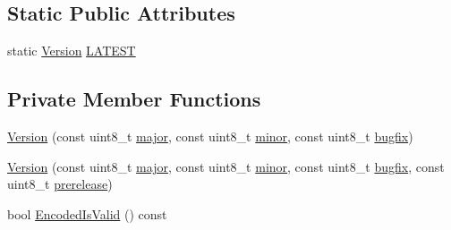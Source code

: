 \subsection*{Static Public Attributes}
\begin{DoxyCompactItemize}
\item 
static \mbox{\hyperlink{classlucene_1_1core_1_1util_1_1etc_1_1Version}{Version}} \mbox{\hyperlink{classlucene_1_1core_1_1util_1_1etc_1_1Version_af15c59aee2ac8af16ebc5f004a553b3d}{L\+A\+T\+E\+ST}}
\end{DoxyCompactItemize}
\subsection*{Private Member Functions}
\begin{DoxyCompactItemize}
\item 
\mbox{\hyperlink{classlucene_1_1core_1_1util_1_1etc_1_1Version_aab6be2fea4aac2881ae89ce58de8adcf}{Version}} (const uint8\+\_\+t \mbox{\hyperlink{classlucene_1_1core_1_1util_1_1etc_1_1Version_a3dfe19c8cebead3a00ef2d62a7258a2f}{major}}, const uint8\+\_\+t \mbox{\hyperlink{classlucene_1_1core_1_1util_1_1etc_1_1Version_af2b0edc664bfbd88c3beeec7aaf1f5cd}{minor}}, const uint8\+\_\+t \mbox{\hyperlink{classlucene_1_1core_1_1util_1_1etc_1_1Version_ae15ce27ea5edc27bce7a15ec1ba725a4}{bugfix}})
\item 
\mbox{\hyperlink{classlucene_1_1core_1_1util_1_1etc_1_1Version_a66271931b8d12d78ca35ec79a559a86e}{Version}} (const uint8\+\_\+t \mbox{\hyperlink{classlucene_1_1core_1_1util_1_1etc_1_1Version_a3dfe19c8cebead3a00ef2d62a7258a2f}{major}}, const uint8\+\_\+t \mbox{\hyperlink{classlucene_1_1core_1_1util_1_1etc_1_1Version_af2b0edc664bfbd88c3beeec7aaf1f5cd}{minor}}, const uint8\+\_\+t \mbox{\hyperlink{classlucene_1_1core_1_1util_1_1etc_1_1Version_ae15ce27ea5edc27bce7a15ec1ba725a4}{bugfix}}, const uint8\+\_\+t \mbox{\hyperlink{classlucene_1_1core_1_1util_1_1etc_1_1Version_aa27ae5fafcfa447563abeb4d1d73ad4f}{prerelease}})
\item 
bool \mbox{\hyperlink{classlucene_1_1core_1_1util_1_1etc_1_1Version_ac27b940b6b38b0a065654ae2f2d82727}{Encoded\+Is\+Valid}} () const
\end{DoxyCompactItemize}
